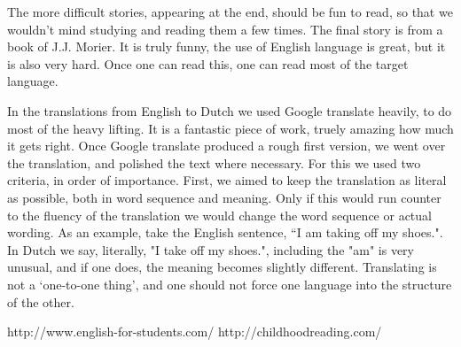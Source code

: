 The more difficult stories, appearing at the end, should be fun to read, so that we wouldn't mind studying and reading them a few times. The final story is from a book of J.J. Morier. It is truly funny, the use of  English language is great, but it is also very hard. Once one can read this, one can read most of the target language. 

In the translations from English to Dutch we used Google translate heavily, to do most of the heavy lifting. It is a fantastic piece of work, truely amazing how much it gets right. Once Google translate produced a rough first version, we went over the translation, and polished the text where necessary. For this we used two criteria, in order of importance. First, we aimed to keep the translation as literal as possible,  both in word sequence and meaning. Only if this would run counter to the fluency of the translation we would change the word sequence or actual wording. As an example, take the English sentence, ``I am taking off my shoes.". In Dutch we say, literally, "I take off my shoes.",  including the "am" is very unusual, and if one does, the meaning becomes slightly different. Translating is not a `one-to-one thing', and one should not force one language into the structure of the other.


http://www.english-for-students.com/
http://childhoodreading.com/
